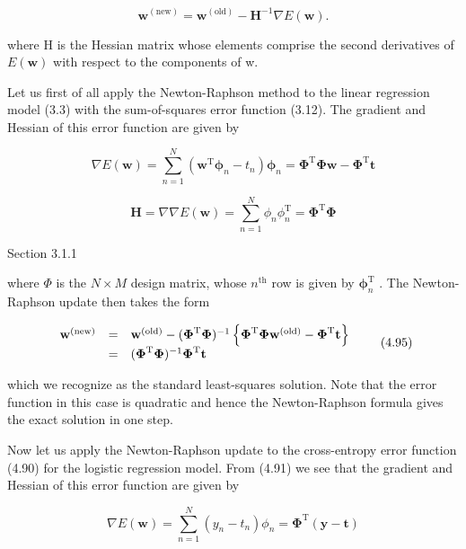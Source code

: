 \documentclass[
  10
]{article}
\begin{document}
\[
\mathbf {w} ^ {\mathrm{(new)}} = \mathbf {w} ^ {\mathrm{(old)}} - \mathbf {H} ^ {- 1} \nabla E (\mathbf {w}).\tag{4.92}
\]

where H is the Hessian matrix whose elements comprise the second
derivatives of \(E ( \mathbf { w } )\) with respect to the components of
w.

Let us first of all apply the Newton-Raphson method to the linear
regression model (3.3) with the sum-of-squares error function (3.12).
The gradient and Hessian of this error function are given by

\[
\nabla E (\mathbf {w}) = \sum_ {n = 1} ^ {N} (\mathbf {w} ^ {\mathrm{T}} \boldsymbol {\phi} _ {n} - t _ {n}) \boldsymbol {\phi} _ {n} = \boldsymbol {\Phi} ^ {\mathrm{T}} \boldsymbol {\Phi} \mathbf {w} - \boldsymbol {\Phi} ^ {\mathrm{T}} \mathbf {t}\tag{4.93}
\]

\[
\mathbf {H} = \nabla \nabla E (\mathbf {w}) = \sum_ {n = 1} ^ {N} \phi_ {n} \phi_ {n} ^ {\mathrm{T}} = \boldsymbol {\Phi} ^ {\mathrm{T}} \boldsymbol {\Phi}\tag{4.94}
\]

Section 3.1.1

where \(\Phi\) is the \(N \times M\) design matrix, whose
\(n ^ { \mathrm { t h } }\) row is given by
\(\boldsymbol { \phi } _ { n } ^ { \mathrm { T } }\) . The
Newton-Raphson update then takes the form

\[
\begin{array}{r c l} \mathbf {w} ^ {\text {(new)}} & = & \mathbf {w} ^ {\text {(old)}} - (\boldsymbol {\Phi} ^ {\text {T}} \boldsymbol {\Phi}) ^ {- 1} \left\{\boldsymbol {\Phi} ^ {\text {T}} \boldsymbol {\Phi} \mathbf {w} ^ {\text {(old)}} - \boldsymbol {\Phi} ^ {\text {T}} \mathbf {t} \right\} \\ & = & (\boldsymbol {\Phi} ^ {\text {T}} \boldsymbol {\Phi}) ^ {- 1} \boldsymbol {\Phi} ^ {\text {T}} \mathbf {t} \end{array}\tag{4.95}
\]

which we recognize as the standard least-squares solution. Note that the
error function in this case is quadratic and hence the Newton-Raphson
formula gives the exact solution in one step.

Now let us apply the Newton-Raphson update to the cross-entropy error
function (4.90) for the logistic regression model. From (4.91) we see
that the gradient and Hessian of this error function are given by

\[
\nabla E (\mathbf {w}) = \sum_ {n = 1} ^ {N} (y _ {n} - t _ {n}) \phi_ {n} = \boldsymbol {\Phi} ^ {\mathrm{T}} (\mathbf {y} - \mathbf {t})\tag{4.96}
\]
\end{document}
